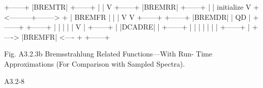 \begin{center}
\begin{boxedverbatim}




                             +------+
                             |BREMTR|
                             +------+
                                 |
                                 |
                                 V
                             +------+
                             |BREMRR|
                             +------+
                                 |
                                 |
                      initialize V
                     + <---------+--------> +
                     |  BREMFR              |
                     |                      |
                     V                      V
                  +------+              +------+
                  |BREMDR|              |  QD  |
                  +------+              +------+
                     |                      |
                     |                      |
                     |                      V
                     |                  +------+
                     |                  |DCADRE|
                     |                  +------+
                     |                      |
                     |                      |
                     |                      |
                     |       +------+       |
                     + ----> |BREMFR| <---- +
                             +------+
 
 
     Fig. A3.2.3b  Bremsstrahlung Related Functions---With Run-
                     Time Approximations (For Comparison
                           with Sampled Spectra).






 A3.2-8
\end{boxedverbatim} 
\end{center}
\newpage {} 
